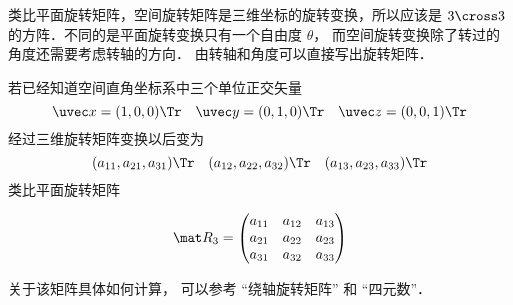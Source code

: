


类比平面旋转矩阵，空间旋转矩阵是三维坐标的旋转变换，所以应该是 $3 \cross 3$ 的方阵．不同的是平面旋转变换只有一个自由度 $\theta $， 而空间旋转变换除了转过的角度还需要考虑转轴的方向． 由转轴和角度可以直接写出旋转矩阵．

若已经知道空间直角坐标系中三个单位正交矢量
\begin{equation}
\uvec x=(1,0,0)\Tr \quad \uvec y=(0,1,0)\Tr \quad \uvec z=(0,0,1)\Tr
\end{equation}
 经过三维旋转矩阵变换以后变为 
\begin{equation}
({a_{11}},{a_{21}},{a_{31}})\Tr \quad ({a_{12}},{a_{22}},{a_{32}})\Tr \quad ({a_{13}},{a_{23}},{a_{33}})\Tr
\end{equation}
类比平面旋转矩阵

\begin{equation}
\mat R_3 = \begin{pmatrix}
{a_{11}}&{a_{12}}&{a_{13}}\\
{a_{21}}&{a_{22}}&{a_{23}}\\
{a_{31}}&{a_{32}}&{a_{33}}
\end{pmatrix}\end{equation}

关于该矩阵具体如何计算， 可以参考 “绕轴旋转矩阵” 和 “四元数”．



